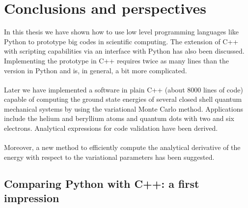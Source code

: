 \chapter{Conclusions and perspectives}\label{conclusions}

In this thesis we have shown how to use low level programming languages like Python to prototype big codes in scientific computing. The extension of C++ with scripting capabilities via an interface with Python has also been discussed. Implementing the prototype in C++ requires twice as many lines than the version in Python and is, in general, a bit more complicated.\\
\\
Later we have implemented a software in plain C++ (about 8000 lines of code) capable of computing the ground state energies of several closed shell quantum mechanical systems by using the variational Monte Carlo method.  Applications include the helium and beryllium atoms and quantum dots with two and six electrons. Analytical expressions for code validation have been derived.\\
\\
Moreover, a new method to efficiently compute the analytical derivative of the energy with respect to the variational parameters has been suggested. 


\section{Comparing Python with C++: a first impression}

